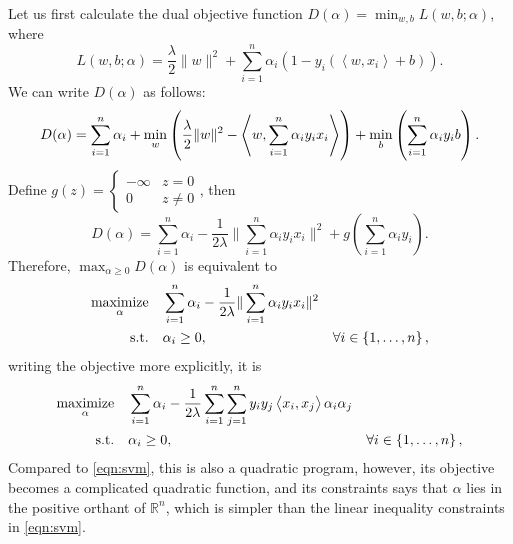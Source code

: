 \documentclass{article}
\DeclareMathOperator*{\maximize}{{\rm maximize}}
\DeclareMathOperator*{\minimize}{{\rm minimize}}
\DeclareMathOperator*{\st}{{\rm s.t.}}
\newcommand{\RR}{\mathbb{R}} %
\newcommand{\inner}[2]{\left\langle #1,#2 \right\rangle}
\begin{document}
Let us first calculate the dual objective function $D(\alpha) = \min_{w,b} L(w,b;\alpha)$, where
\[ L(w,b;\alpha) = \frac \lambda 2 \| w \|^2 + \sum_{i=1}^n \alpha_i (1 - y_i(\inner{w}{x_i} + b)). \]
We can write $D(\alpha)$ as follows:
\[ D(\alpha) = \sum_{i=1}^n \alpha_i + \min_w\del{\frac \lambda 2 \| w \|^2 - \inner{w}{\sum_{i=1}^n \alpha_i y_i x_i}} + \min_b \del{\sum_{i=1}^n \alpha_i y_i b}. \]
Define $g(z) = \begin{cases} -\infty & z = 0 \\ 0 & z \neq 0 \end{cases}$, then
\[ D(\alpha) = \sum_{i=1}^n \alpha_i - \frac{1}{2\lambda}\| \sum_{i=1}^n \alpha_i y_i x_i \|^2 + g(\sum_{i=1}^n \alpha_i y_i). \]
Therefore, $\max_{\alpha \geq 0} D(\alpha)$ is equivalent to
\begin{align}
  \maximize_{\alpha} \quad & \sum_{i=1}^n \alpha_i - \frac{1}{2\lambda} \|\sum_{i=1}^n \alpha_i y_i x_i\|^2 & \label{eqn:svm-dual-unexp} \\
    \st \quad &  \alpha_i \geq 0, &\forall i \in \cbr{1,\ldots,n}, \nonumber
\end{align}
writing the objective more explicitly, it is
\begin{align}
  \maximize_{\alpha} \quad & \sum_{i=1}^n \alpha_i - \frac{1}{2\lambda} \sum_{i=1}^n \sum_{j=1}^n y_i y_j \inner{x_i}{x_j} \alpha_i \alpha_j & \label{eqn:svm-dual} \\
    \st \quad &  \alpha_i \geq 0, &\forall i \in \cbr{1,\ldots,n}, \nonumber
\end{align}
Compared to \eqref{eqn:svm}, this is also a quadratic program, however, its objective becomes a complicated quadratic function, and its constraints says that $\alpha$ lies in the positive orthant of $\RR^n$, which is simpler than the linear inequality constraints in \eqref{eqn:svm}.

\end{document}

